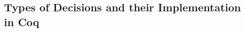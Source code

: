 \documentclass[runningheads,a4paper]{llncs}
\newcommand{\syn}{\texttt}
\begin{document}


\subsection{Types of Decisions and their Implementation in Coq}\label{sec:answerandresulttypes}
\end{document}
